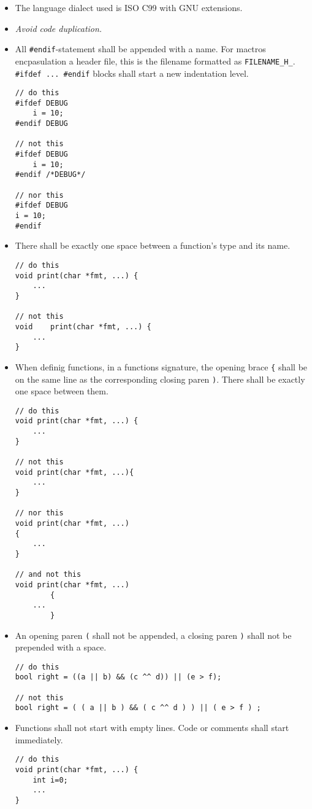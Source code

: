 \begin{itemize}
\item The language dialect used is ISO C99  with GNU extensions.
\item \emph{Avoid code duplication.}
\item All \lstinline|#endif|-statement shall be appended with a
  name. For mactros encpasulation a header file, this is the filename
  formatted as \lstinline|FILENAME_H_|.
\lstinline|#ifdef ... #endif| blocks shall start a new indentation
level.
\begin{lstlisting}
// do this
#ifdef DEBUG
    i = 10;
#endif DEBUG

// not this
#ifdef DEBUG
    i = 10;
#endif /*DEBUG*/

// nor this
#ifdef DEBUG
i = 10;
#endif
\end{lstlisting}
\item There shall be exactly one space between a function's type and
  its name.
\begin{lstlisting}
// do this
void print(char *fmt, ...) {
    ...
}

// not this
void    print(char *fmt, ...) {
    ...
}
\end{lstlisting}
\item When definig functions, in a functions signature, the opening
  brace \lstinline|{| shall be on the  same line as the corresponding
    closing paren \lstinline|)|. There shall be exactly one space between them.
\begin{lstlisting}
// do this
void print(char *fmt, ...) {
    ...
}

// not this
void print(char *fmt, ...){
    ...
}

// nor this
void print(char *fmt, ...)
{
    ...
}

// and not this
void print(char *fmt, ...)
        {
    ...
        }
\end{lstlisting}
\item An opening paren \lstinline|(| shall not be appended, a closing
  paren \lstinline|)| shall not be prepended with a space.
\begin{lstlisting}
// do this
bool right = ((a || b) && (c ^^ d)) || (e > f);

// not this
bool right = ( ( a || b ) && ( c ^^ d ) ) || ( e > f ) ;
\end{lstlisting}
\item Functions shall not start with empty lines. Code or comments
  shall start immediately.
\begin{lstlisting}
// do this
void print(char *fmt, ...) {
    int i=0;
    ...
}


\end{lstlisting}
\end{itemize}
